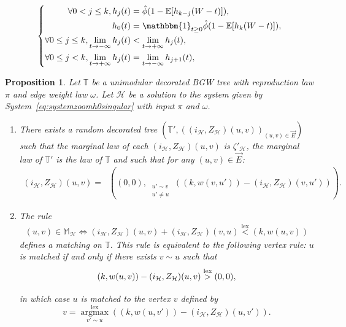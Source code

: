 \documentclass[10pt,a4paper]{amsart}
\newtheorem{prop}{Proposition}
\DeclareMathOperator*{\argmax}{argmax}
\DeclareMathOperator{\lex}{lex}
\DeclareMathOperator*{\maxlex}{\overset{\lex}{\max}}
\begin{document}
\begin{equation}\label{eq:systemzoomh0singular}
\left\{
\begin{aligned}
    \forall 0 < j \leq k, h_j(t)&= \hat{\phi}(1-\mathbb{E}[h_{{k-j}}(W-t)]), \\
    h_0(t)&= \mathbbm{1}_{t \geq 0} \hat{\phi}(1-\mathbb{E}[h_{k}(W-t)]),\\
    \forall 0 \leq j \leq k, \lim_{t \rightarrow -\infty} h_j(t) &< \lim_{t \rightarrow + \infty}h_j(t),  \\
    \forall 0 \leq j < k, \lim_{t \rightarrow + \infty}h_j(t) &= \lim_{t \rightarrow -\infty}h_{j+1}(t), 
\end{aligned}
\right.
\end{equation}

\begin{prop}\label{prop:Zconstruction}
    Let $\mathbb{T}$ be a unimodular decorated BGW tree with reproduction law $\pi$ and edge weight law $\omega$. Let $\mathcal{H}$ be a solution to the system given by System~\eqref{eq:systemzoomh0singular} with input $\pi$ and $\omega$.
    \begin{enumerate}[label=\roman*)]
        \item There exists a random decorated tree $(\mathbb{T}',((i_{\mathcal{H}},Z_{\mathcal{H}})(u,v))_{(u,v) \in \overset{\rightarrow}{E}})$ such that the marginal law of each $(i_{\mathcal{H}},Z_{\mathcal{H}})(u,v)$ is $\zeta'_{\mathcal{H}}$, the marginal law of $\mathbb{T}'$ is the law of $\mathbb{T}$ and such that for any $(u,v) \in \overset{\rightarrow}{E}$:
        \begin{equation}\label{eq:systemrecursionzoombis}
    \begin{aligned}
        (i_{\mathcal{H}},Z_{\mathcal{H}})(u,v)=\maxlex\left( (0,0) , \maxlex_{\substack{ u' \sim v \\ u' \neq u}}\left( (k,w(v,u'))-(i_{\mathcal{H}},Z_{\mathcal{H}})(v,u') \right) \right).
    \end{aligned}
\end{equation}
        \item The rule
        \begin{align}\label{eq:decisionrule}
            (u,v) \in \mathbb{M}_{\mathcal{H}} \Leftrightarrow (i_{\mathcal{H}},Z_{\mathcal{H}})(u,v)+(i_{\mathcal{H}},Z_{\mathcal{H}})(v,u)\overset{\lex}{<} (k,w(u,v)) 
        \end{align}
        defines a matching on $\mathbb{T}$. This rule is equivalent to the following vertex rule:
        $u$ is matched if and only if there exists $v\sim u$ such that
\begin{equation}\label{eq:vertexrulebis}
        \vphantom{\underset{v' \sim u}{\overset{\lex}{\argmax}}}
        (k,w(u,v))-(i_{\mathcal{H}},Z_{\mathcal{H}})(u,v) \overset{\lex}{>} (0,0),
\end{equation}
in which case $u$ is matched to the vertex $v$ defined by
\begin{equation}
        v=\underset{v' \sim u}{\overset{\lex}{\argmax}} \left( (k,w(u,v'))-(i_{\mathcal{H}},Z_{\mathcal{H}})(u,v') \right).
\end{equation}


\end{enumerate}
\end{prop}
\end{document}
